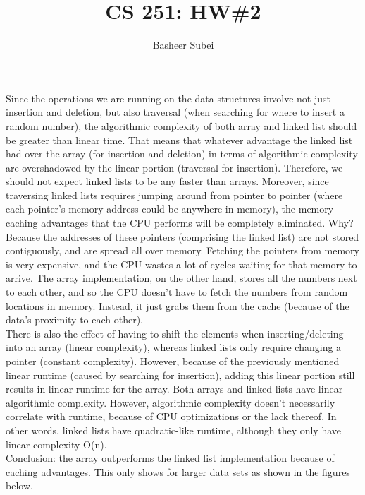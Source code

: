\documentclass[11pt, twoside]{article}
\begin{document}


\title{CS 251: HW\#2}
\author{Basheer Subei}


\maketitle

Since the operations we are running on the data structures involve not just
insertion and deletion, but also traversal (when searching for where to insert
a random number), the algorithmic complexity of both array and linked list
should be greater than linear time. That means that whatever advantage the
linked list had over the array (for insertion and deletion) in terms of
algorithmic complexity are overshadowed by the linear portion (traversal for
insertion). Therefore, we should not expect linked lists to be any faster than
arrays. Moreover, since traversing linked lists requires jumping around from pointer to pointer (where each pointer's memory address could be anywhere in memory), the memory caching advantages that the CPU performs will be completely eliminated. Why? Because the addresses of these pointers (comprising the linked list) are not stored contiguously, and are spread all over memory. Fetching the pointers from memory is very expensive, and the CPU wastes a lot of cycles waiting for that memory to arrive. The array implementation, on the other hand, stores all the numbers next to each other, and so the CPU doesn't have to fetch the numbers from random locations in memory. Instead, it just grabs them from the cache (because of the data's proximity to each other).\\

There is also the effect of having to shift the elements when inserting/deleting into an array (linear complexity), whereas linked lists only require changing a pointer (constant complexity). However, because of the previously mentioned linear runtime (caused by searching for insertion), adding this linear portion still results in linear runtime for the array. Both arrays and linked lists have linear algorithmic complexity. However, algorithmic complexity doesn't necessarily correlate with runtime, because of CPU optimizations or the lack thereof. In other words, linked lists have quadratic-like runtime, although they only have linear complexity O(n).\\

Conclusion: the array outperforms the linked list implementation because of caching advantages. This only shows for larger data sets as shown in the figures below.
\end{document}
